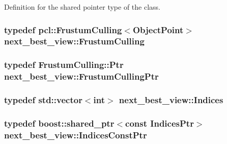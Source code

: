 \-Definition for the shared pointer type of the class. 

\hypertarget{namespacenext__best__view_aa1201b49d32ff76f8a0c36a110dcfe63}{
\subsubsection[{\-Frustum\-Culling}]{\setlength{\rightskip}{0pt plus 5cm}typedef pcl\-::\-Frustum\-Culling$<${\bf \-Object\-Point}$>$ {\bf next\-\_\-best\-\_\-view\-::\-Frustum\-Culling}}}\label{namespacenext__best__view_aa1201b49d32ff76f8a0c36a110dcfe63}
\hypertarget{namespacenext__best__view_a74d8e247c31e7c8d1bb9ad36281ee154}{
\subsubsection[{\-Frustum\-Culling\-Ptr}]{\setlength{\rightskip}{0pt plus 5cm}typedef \-Frustum\-Culling\-::\-Ptr {\bf next\-\_\-best\-\_\-view\-::\-Frustum\-Culling\-Ptr}}}\label{namespacenext__best__view_a74d8e247c31e7c8d1bb9ad36281ee154}
\hypertarget{namespacenext__best__view_a5f7bbbd3006b454db2619c31098a6e61}{
\subsubsection[{\-Indices}]{\setlength{\rightskip}{0pt plus 5cm}typedef std\-::vector$<$int$>$ {\bf next\-\_\-best\-\_\-view\-::\-Indices}}}\label{namespacenext__best__view_a5f7bbbd3006b454db2619c31098a6e61}
\hypertarget{namespacenext__best__view_aff39a56fc33771e72386f8cc4c9dadfc}{
\subsubsection[{\-Indices\-Const\-Ptr}]{\setlength{\rightskip}{0pt plus 5cm}typedef boost\-::shared\-\_\-ptr$<$const {\bf \-Indices\-Ptr}$>$ {\bf next\-\_\-best\-\_\-view\-::\-Indices\-Const\-Ptr}}}\label{namespacenext__best__view_aff39a56fc33771e72386f8cc4c9dadfc}

